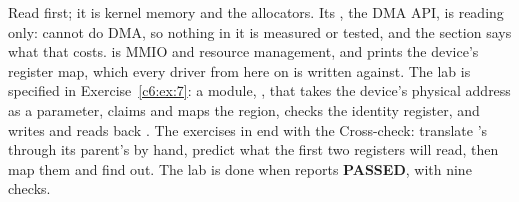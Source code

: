 Read  first; it is kernel memory and the allocators. Its , the
DMA API, is reading only:  cannot do DMA, so nothing in it is measured or tested, and
the section says what that costs.  is MMIO and resource management, and prints the
device's register map, which every driver from here on is written against. The lab is specified in
Exercise~\ref{c6:ex:7}: a module, , that takes the device's physical address as a
parameter, claims and maps the region, checks the identity register, and writes and reads back
. The exercises in  end with the Cross-check: translate
's  through its parent's  by hand, predict what the first two
registers will read, then map them and find out. The lab is done when 
reports \textbf{PASSED}, with nine checks.





